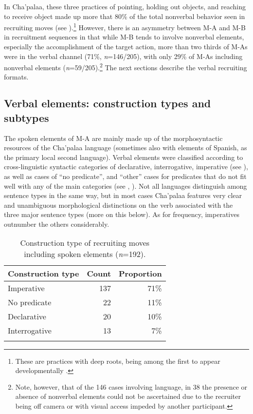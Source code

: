 \documentclass[output=paper]{langsci/langscibook}
\begin{document}
\normalsize
In Cha'palaa, these three practices of pointing, holding out objects, and reaching to receive object made up more that 80\% of the total nonverbal behavior seen in recruiting moves (see ).\footnote{ These are practices with deep roots, being among the first to appear developmentally \citep{Masur1983,Cameron_FaulknerEtAl2015}.} However, there is an asymmetry between M-A and M-B in recruitment sequences in that while M-B tends to involve nonverbal elements, especially the accomplishment of the target action, more than two thirds of M-As were in the verbal channel (71\%, \textit{n}=146/205), with only 29\% of M-As including nonverbal elements (\textit{n}=59/205).\footnote{Note, however, that of the 146 cases involving language, in 38 the presence or absence of nonverbal elements could not be ascertained due to the recruiter being off camera or with visual access impeded by another participant.} The next sections describe the verbal recruiting formats.

\subsection{Verbal elements: construction types and subtypes}\label{sec:floyd:3.3}

The spoken elements of M-A are mainly made up of the morphosyntactic resources of the Cha'palaa language (sometimes also with elements of Spanish, as the primary local second language). Verbal elements were classified according to cross-linguistic syntactic categories of declarative, interrogative, imperative (see \citealt{KönigSiemund2007}), as well as cases of “no predicate”, and “other” cases for predicates that do not fit well with any of the main categories (see , ). Not all languages distinguish among sentence types in the same way, but in most cases Cha'palaa features very clear and unambiguous morphological distinctions on the verb associated with the three major sentence types (more on this below). As for frequency, imperatives outnumber the others considerably.

\begin{table}
\begin{tabularx}{0.66\textwidth}{Xrr}
\lsptoprule
Construction type & Count & Proportion\\
\midrule
Imperative & 137 & 71\%\\
No predicate & 22 & 11\%\\
Declarative & 20 & 10\%\\
Interrogative & 13 & 7\%\\
\lspbottomrule
\end{tabularx}
\caption{Construction type of recruiting moves including spoken elements (\textit{n}=192).}
\label{tab:floyd:3}
\end{table}
\end{document}
